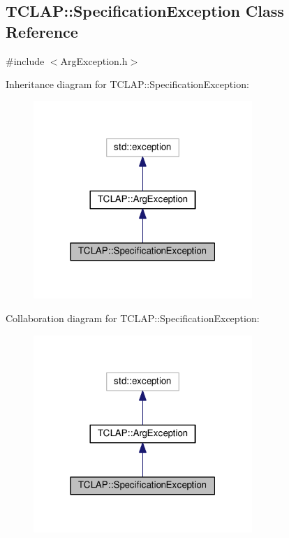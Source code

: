 \hypertarget{classTCLAP_1_1SpecificationException}{}\subsection{T\+C\+L\+AP\+:\+:Specification\+Exception Class Reference}
\label{classTCLAP_1_1SpecificationException}


{\ttfamily \#include $<$Arg\+Exception.\+h$>$}



Inheritance diagram for T\+C\+L\+AP\+:\+:Specification\+Exception\+:
\nopagebreak
\begin{figure}[H]
\begin{center}
\leavevmode
\includegraphics[width=235pt]{classTCLAP_1_1SpecificationException__inherit__graph}
\end{center}
\end{figure}


Collaboration diagram for T\+C\+L\+AP\+:\+:Specification\+Exception\+:
\nopagebreak
\begin{figure}[H]
\begin{center}
\leavevmode
\includegraphics[width=235pt]{classTCLAP_1_1SpecificationException__coll__graph}
\end{center}
\end{figure}
